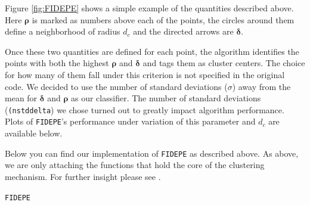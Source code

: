 \documentclass[12pt]{article}
\begin{document}
\FloatBarrier
Figure \ref{fig:FIDEPE} shows a simple example of the quantities described above. Here $\boldsymbol{\rho}$ is marked as numbers above each of the points, the circles around them define a neighborhood of radius $d_c$ and the directed arrows are $\boldsymbol{\delta}$.
\par Once these two quantities are defined for each point, the algorithm identifies the points with both the highest $\boldsymbol{\rho}$ and $\boldsymbol{\delta}$ and tags them as cluster centers. The choice for how many of them fall under this criterion is not specified in the original code. We decided to use the number of standard deviations ($\sigma$) away from the mean for $\boldsymbol{\delta}$ and $\boldsymbol{\rho}$ as our classifier. The number of standard deviations (\texttt{(nstddelta}) we chose turned out to greatly impact algorithm performance. Plots of \texttt{FIDEPE}'s performance under variation of this parameter and $d_c$ are available below.

Below you can find our implementation of \texttt{FIDEPE} as described above. As above, we are only attaching the functions that hold the core of the clustering mechanism. For further insight please see \cite{git}.

\singlespacing
\begin{center}
\texttt{FIDEPE}
\end{center}

\doublespacing
\end{document}
